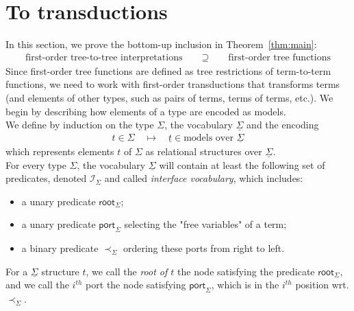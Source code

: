 \newcommand{\Root}[1]{\mathsf{root}_{#1}}
\newcommand{\Port}[1]{\mathsf{port}_{#1}}
\newcommand{\Interface}[1]{\mathsf{Interface}_{#1}}
\section{To transductions}
\label{sec:to-transductions}
In this section, we prove the bottom-up inclusion in Theorem~\ref{thm:main}:
\begin{align*}
    \text{first-order tree-to-tree interpretations} \qquad \supseteq \qquad \text{first-order tree functions}
\end{align*}
Since first-order tree functions are defined as tree restrictions of term-to-term functions, we need to work with first-order transductions that transforms terms (and elements of other types, such as pairs of terms, terms of terms, etc.). We begin by describing how elements of a type are encoded as models. 
\\

We define by induction on the type $\Sigma$, the vocabulary $\underline \Sigma$ and the encoding 
 \begin{align*}
     t \in \Sigma \quad \mapsto \quad \underline t \in \text{models over $\underline \Sigma$}
 \end{align*}
 which represents elements $t$ of $\Sigma$ as relational structures over $\underline \Sigma$.
 \\
 
 For every type $\Sigma$, the vocabulary $\underline \Sigma$ will contain at least the following set of predicates, denoted $\mathcal{I}_\Sigma$ and called \emph{interface vocabulary}, which includes:
 \begin{itemize}
 \item a unary predicate $\Root{\Sigma}$;
  \item a unary predicate $\Port{\Sigma}$ selecting the "free variables" of a term; 
 \item a binary predicate $\prec_\Sigma$ ordering these ports from right to left.  
\end{itemize}  

For a $\underline\Sigma$ structure $t$, we call the \emph{root of $t$} the node satisfying the predicate $\Root{\Sigma}$, and we call {the $i^{th}$ port} the node satisfying $\Port\Sigma$, which is in the $i^{th}$ position wrt. $\prec_\Sigma$. 
\\

